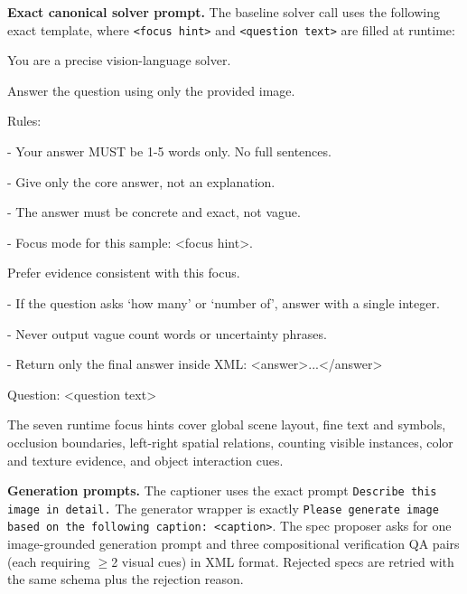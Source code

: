 \documentclass[runningheads]{llncs}
\begin{document}
\noindent\textbf{Exact canonical solver prompt.}
The baseline solver call uses the following exact template, where \texttt{<focus hint>} and \texttt{<question text>} are filled at runtime:
\begin{promptbox}
\small
\ttfamily\raggedright
You are a precise vision-language solver.\par
Answer the question using only the provided image.\par
Rules:\par
- Your answer MUST be 1-5 words only. No full sentences.\par
- Give only the core answer, not an explanation.\par
- The answer must be concrete and exact, not vague.\par
- Focus mode for this sample: <focus hint>.\par
  Prefer evidence consistent with this focus.\par
- If the question asks `how many' or `number of', answer with a single integer.\par
- Never output vague count words or uncertainty phrases.\par
- Return only the final answer inside XML: <answer>...</answer>\par
Question: <question text>
\end{promptbox}
The seven runtime focus hints cover global scene layout, fine text and symbols, occlusion boundaries, left-right spatial relations, counting visible instances, color and texture evidence, and object interaction cues.

\noindent\textbf{Generation prompts.}
The captioner uses the exact prompt \texttt{Describe this image in detail.} The generator wrapper is exactly \texttt{Please generate image based on the following caption: <caption>}. The spec proposer asks for one image-grounded generation prompt and three compositional verification QA pairs (each requiring $\geq$2 visual cues) in XML format. Rejected specs are retried with the same schema plus the rejection reason.
\end{document}
